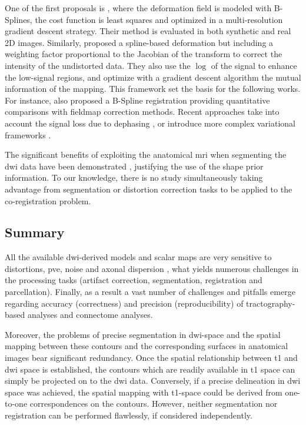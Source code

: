 One of the first proposals is \citep{kybic_unwarping_2000}, where the deformation
field is modeled with B-Splines, the cost function is least squares and optimized
in a multi-resolution gradient descent strategy. Their method is evaluated in 
both synthetic and real 2D images. Similarly,
\citep{studholme_accurate_2000} proposed a spline-based deformation but including
a weighting factor proportional to the Jacobian of the transform to correct the
intensity of the undistorted data. They also use the $\log$ of the signal to
enhance the low-signal regions, and optimize with a gradient descent algorithm
the mutual information of the mapping. This framework set the basis for the following
works. For instance, \citep{wu_comparison_2008} also proposed a B-Spline registration
providing quantitative comparisons with fieldmap correction methods. Recent approaches
take into account the signal loss due to dephasing \citep{li_accounting_2007}, or 
introduce more complex variational frameworks \citep{tao_variational_2009}.

The significant benefits of exploiting the anatomical \gls{mri} when 
segmenting the \gls{dwi} data have been demonstrated \cite{zollei_improved_2010}, 
justifying the use of the shape prior information. To our knowledge, there is
no study simultaneously taking advantage from segmentation or distortion correction
tasks to be applied to the co-registration problem.

\subsection{Summary}
\label{sec:contributions}

All the available \gls{dwi}-derived models and scalar maps 
are very sensitive to distortions, \gls{pve}, noise and axonal dispersion 
\citep{jbabdi_tractography:_2011}, what yields numerous challenges in the
processing tasks (artifact correction, segmentation, registration and 
parcellation). Finally, as a result a vast number of challenges and pitfalls 
emerge regarding accuracy (correctness) and precision (reproducibility) of 
tractography-based analyses \citep{jones_white_2013} and connectome
analyses.

Moreover, the problems of precise segmentation in \gls{dwi}-space and the 
spatial mapping between these contours and the corresponding surfaces in 
anatomical images bear significant redundancy. Once the spatial relationship 
between \gls{t1} and \gls{dwi} space is established, the contours which are 
readily available in \gls{t1} space can simply be projected on to the 
\gls{dwi} data. Conversely, if a precise delineation in \gls{dwi} space 
was achieved, the spatial mapping with \gls{t1}-space could be derived 
from one-to-one correspondences on the contours. However, neither segmentation 
nor registration can be performed flawlessly, if considered independently. 

